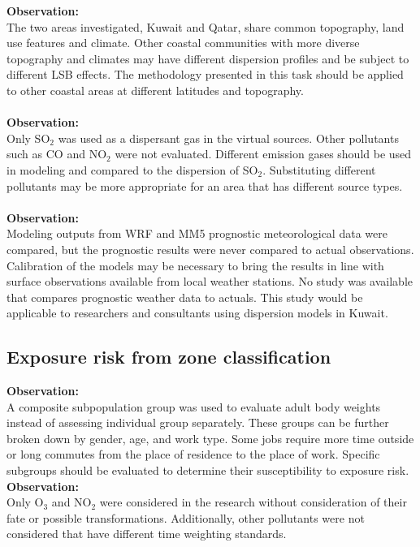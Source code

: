 \noindent
\textbf{Observation:}\\
The two areas investigated, Kuwait and Qatar, share common topography, land use features and climate. Other coastal communities with more diverse topography and climates may have different dispersion profiles and be subject to different LSB effects. The methodology presented in this task should be applied to other coastal areas at different latitudes and topography.\\
\noindent\\
\textbf{Observation:}\\
Only SO$_{2}$ was used as a dispersant gas in the virtual sources. Other pollutants such as CO and NO$_{2}$ were not evaluated. Different emission gases should be used in modeling and compared to the dispersion of SO$_{2}$. Substituting different pollutants may be more appropriate for an area that has different source types.\\
\noindent\\
\textbf{Observation:}\\
Modeling outputs from WRF and MM5 prognostic meteorological data were compared, but the prognostic results were never compared to actual observations. Calibration of the models may be necessary to bring the results in line with surface observations available from local weather stations. No study was available that compares prognostic weather data to actuals. This study would be applicable to researchers and consultants using dispersion models in Kuwait.

\subsection*{Exposure risk from zone classification}
\noindent
\textbf{Observation:}\\
A composite subpopulation group was used to evaluate adult body weights instead of assessing individual group separately. These groups can be further broken down by gender, age, and work type. Some jobs require more time outside or long commutes from the place of residence to the place of work. Specific subgroups should be evaluated to determine their susceptibility to exposure risk.\\

\noindent
\textbf{Observation:}\\
Only O$_{3}$ and NO$_{2}$ were considered in the research without consideration of their fate or possible transformations. Additionally, other pollutants were not considered that have different time weighting standards. 

